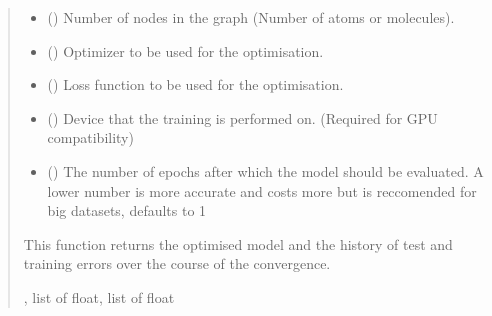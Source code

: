 \documentclass[a4paper,10pt,english]{report}
\begin{document}
\begin{fulllineitems}
\begin{quote}
\begin{description}
\begin{itemize}
\item {} 
\sphinxAtStartPar
{} () \textendash{} Number of nodes in the graph (Number of atoms or molecules).

\item {} 
\sphinxAtStartPar
{} () \textendash{} Optimizer to be used for the optimisation.

\item {} 
\sphinxAtStartPar
{} () \textendash{} Loss function to be used for the optimisation.

\item {} 
\sphinxAtStartPar
{} () \textendash{} Device that the training is performed on. (Required for GPU compatibility)

\item {} 
\sphinxAtStartPar
{} (\sphinxstyleliteralemphasis{\sphinxupquote{, }}) \textendash{} The number of epochs after which the model should be evaluated. A lower number is more accurate and costs more but is reccomended for big datasets, defaults to 1

\end{itemize}

\sphinxAtStartPar
This function returns the optimised model and the history of test and training errors over the course of the convergence.

\sphinxAtStartPar
{\hyperref[\detokenize{NNucleate:NNucleate.models.GNNCV}]{}}, list of float, list of float

\end{description}\end{quote}

\end{fulllineitems}

\end{document}
